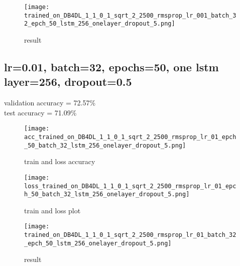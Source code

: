 \documentclass{article}
\begin{document}
\begin{figure}[H]
\centering
\texttt{[image: trained\_on\_DB4DL\_1\_1\_0\_1\_sqrt\_2\_2500\_rmsprop\_lr\_001\_batch\_32\_epch\_50\_lstm\_256\_onelayer\_dropout\_5.png]}
\caption{result}
\end{figure}

\bigskip
\subsection{lr=0.01, batch=32, epochs=50, one lstm layer=256, dropout=0.5}
validation accuracy = 72.57\%
\\
test accuracy = 71.09\%

\begin{figure}[H]
\centering
\texttt{[image: acc\_trained\_on\_DB4DL\_1\_1\_0\_1\_sqrt\_2\_2500\_rmsprop\_lr\_01\_epch\_50\_batch\_32\_lstm\_256\_onelayer\_dropout\_5.png]}
\caption{train and loss accuracy}
\end{figure}

\begin{figure}[H]
\centering
\texttt{[image: loss\_trained\_on\_DB4DL\_1\_1\_0\_1\_sqrt\_2\_2500\_rmsprop\_lr\_01\_epch\_50\_batch\_32\_lstm\_256\_onelayer\_dropout\_5.png]}
\caption{train and loss plot}
\end{figure}

\begin{figure}[H]
\centering
\texttt{[image: trained\_on\_DB4DL\_1\_1\_0\_1\_sqrt\_2\_2500\_rmsprop\_lr\_01\_batch\_32\_epch\_50\_lstm\_256\_onelayer\_dropout\_5.png]}
\caption{result}
\end{figure}
\end{document}
